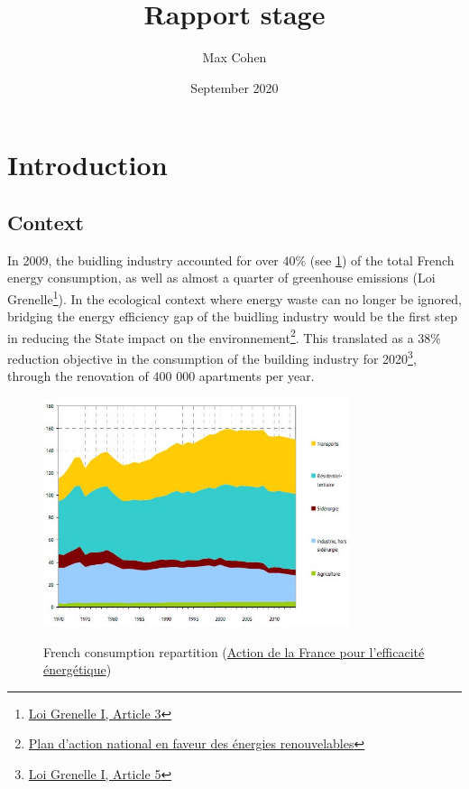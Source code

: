 \documentclass[12pt]{article}
\title{Rapport stage}
\author{Max Cohen}
\date{September 2020}
\begin{document}
\begin{titlepage}
    \maketitle
\end{titlepage}

\tableofcontents

\section{Introduction}

\subsection{Context}
In 2009, the buidling industry accounted for over 40\% (see \ref{consumption_repartition}) of the total French energy consumption, as well as almost a quarter of greenhouse emissions (Loi Grenelle\footnote{\href{https://www.legifrance.gouv.fr/loda/id/JORFTEXT000020949548/2020-09-21/}{Loi Grenelle I, Article 3}}). In the ecological context where energy waste can no longer be ignored, bridging the energy efficiency gap of the buidling industry would be the first step in reducing the State impact on the environnement\footnote{\href{http://temis.documentation.developpement-durable.gouv.fr/docs/Temis/0067/Temis-0067836/18854.pdf}{Plan d'action national en faveur des énergies renouvelables}}. This translated as a 38\% reduction objective in the consumption of the building industry for 2020\footnote{\href{https://www.legifrance.gouv.fr/loda/id/JORFTEXT000020949548/2020-09-21/}{Loi Grenelle I, Article 5}}, through the renovation of 400 000 apartments per year.

\begin{figure}
    \caption{French consumption repartition (\href{https://www.ecologie.gouv.fr/action-france-lefficacite-energetique}{Action de la France pour l’efficacité énergétique})}
    \centering
    \includegraphics[width=0.8\textwidth]{consumption_evolution_1970_2015.jpg}
    \label{consumption_repartition}
\end{figure}
\end{document}
